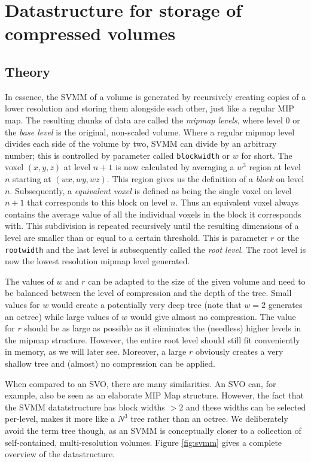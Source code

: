 \chapter{Datastructure for storage of compressed volumes}  \label{ch:datastructure}


\section{Theory}

In essence, the SVMM of a volume is generated by recursively creating copies of a lower resolution and storing them alongside each other, just like a regular MIP map. The resulting chunks of data are called the \emph{mipmap levels}, where level 0 or the \emph{base level} is the original, non-scaled volume. Where a regular mipmap level divides each side of the volume by two, SVMM can divide by an arbitrary number; this is controlled by parameter called \texttt{blockwidth} or $w$ for short.
The voxel $(x,y,z)$ at level $n+1$ is now calculated by averaging a $w^{3}$ region at level $n$ starting at $(wx,wy,wz)$. This region gives us the definition of a \emph{block} on level $n$. Subsequently, a \emph{equivalent voxel} is defined as being the single voxel on level $n+1$ that corresponds to this block on level $n$. Thus an equivalent voxel always contains the average value of all the individual voxels in the block it corresponds with.
This subdivision is repeated recursively until the resulting dimensions of a level are smaller than or equal to a certain threshold. This is parameter $r$ or the \texttt{rootwidth} and the last level is subsequently called the \emph{root level}. The root level is now the lowest resolution mipmap level generated. 

The values of $w$ and $r$ can be adapted to the size of the given volume and need to be balanced between the level of compression and the depth of the tree. Small values for $w$ would create a potentially very deep tree (note that $w=2$ generates an octree) while large values of $w$ would give almost no compression. The value for $r$ should be as large as possible as it eliminates the (needless) higher levels in the mipmap structure. However, the entire root level should still fit conveniently in memory, as we will later see. Moreover, a large $r$ obviously creates a very shallow tree and (almost) no compression can be applied.

When compared to an SVO, there are many similarities. An SVO can, for example, also be seen as an elaborate MIP Map structure. However, the fact that the SVMM datatstructure has block widths $>2$ and these widths can be selected per-level, makes it more like a $N^3$ tree rather than an octree. We deliberately avoid the term tree though, as an SVMM is conceptually closer to a collection of self-contained, multi-resolution volumes. Figure \ref{fig:svmm} gives a complete overview of the datastructure.

